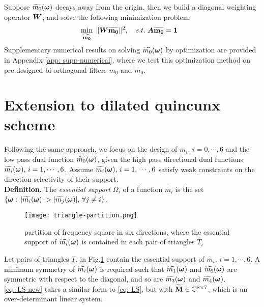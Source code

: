 Suppose $\widetilde{m_{0}}(\boldsymbol{\omega})$ decays away from the origin, then we build a diagonal weighting operator $\boldsymbol{W}$, and solve the following minimization problem:
\begin{align}\label{eq: opt-weight}
&\min_{\mathbf{\widetilde{m_{0}}}}\; \Vert \boldsymbol{W}\mathbf{\widetilde{m_{0}}}\Vert^2,\quad s.t. \; \boldsymbol{A}\mathbf{\widetilde{m_{0}}} = \mathbf{1}
\end{align}
Supplementary numerical results on solving $\widetilde{m_{0}}(\boldsymbol{\omega})$ by optimization are provided in Appendix \ref{app: supp-numerical}, where we test this optimization method on pre-designed bi-orthogonal filters $m_0$ and $\widetilde{m_0}$.

\section{Extension to dilated quincunx scheme}
Following the same approach, we focus on the design of $m_i,\,i=0,\cdots,6$ and the low pass dual function $\widetilde{m_{0}}(\boldsymbol{\omega})$, given the high pass directional dual functions $\widetilde{m_{i}}(\boldsymbol{\omega}),\,i=1,\cdots,6$. Assume $\widetilde{m_{i}}(\boldsymbol{\omega}),\,i=1,\cdots,6$ satisfy weak constraints on the direction selectivity of their support.\\
{\bf Definition.}
The {\it essential support} $\Omega_i$ of a function $\widetilde{m_i}$ is the set $\{\V{\omega}:\,|\widetilde{m_i}(\V{\omega})|> |\widetilde{m_j}(\V{\omega})|,\,\forall j\neq i\}$. 

\begin{figure}
\centering
\texttt{[image: triangle-partition.png]}
\caption{partition of frequency square in six directions, where the essential support of $\widetilde{m_{i}}(\boldsymbol{\omega})$ is contained in each pair of triangles $T_i$}
\label{fig: partition 2}
\end{figure}
Let pairs of triangles $T_i$ in Fig.\ref{fig: partition 2} contain the essential support of $\widetilde{m_i},\,i=1,\cdots,6$.
A minimum symmetry of $\widetilde{m_{i}}(\boldsymbol{\omega})$ is required such that $\widetilde{m_{1}}(\boldsymbol{\omega})$ and $\widetilde{m_{6}}(\boldsymbol{\omega})$ are symmetric with respect to the diagonal, and so are $\widetilde{m_{3}}(\boldsymbol{\omega})$ and $\widetilde{m_{4}}(\boldsymbol{\omega})$.\\
\eqref{eq: LS-new} takes a similar form to \eqref{eq: LS}, but with $\widetilde{\mathbf{M}}\in\mathbb{C}^{8\times 7}$, which is an over-determinant linear system.

